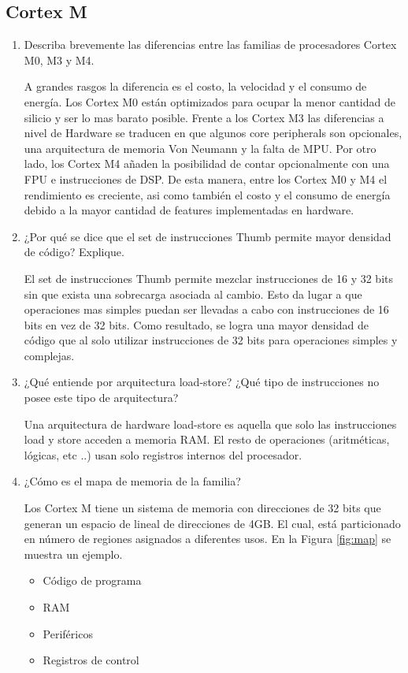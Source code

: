 \documentclass[12pt, a4paper]{article}
\begin{document}
\subsection{Cortex M}
\begin{enumerate}
    \item Describa brevemente las diferencias entre las familias de procesadores Cortex M0, M3 
    y M4.
    
    A grandes rasgos la diferencia es el costo, la velocidad y el consumo de energía. Los 
    Cortex M0 están optimizados para ocupar la menor cantidad de silicio y ser lo mas barato 
    posible. Frente a los Cortex M3 las diferencias a nivel de Hardware se traducen en
    que algunos core peripherals son opcionales, una arquitectura de memoria Von Neumann y la 
    falta de MPU. Por otro lado, los Cortex M4 añaden la posibilidad de contar opcionalmente 
    con una FPU e instrucciones de DSP. De esta manera, entre los Cortex M0 y M4 el rendimiento
    es creciente, asi como también el costo y el consumo de energía debido a la mayor cantidad 
    de features implementadas en hardware.
    
    \item ¿Por qué se dice que el set de instrucciones Thumb permite mayor densidad de código?
    Explique.
    
    El set de instrucciones Thumb permite mezclar instrucciones de 16 y 32 bits sin que exista una 
    sobrecarga asociada al cambio. Esto da lugar a que operaciones mas simples puedan ser llevadas 
    a cabo con instrucciones de 16 bits en vez de 32 bits. Como resultado, se logra 
    una mayor densidad de código que al solo utilizar instrucciones de 32 bits para operaciones 
    simples y complejas.
        
    \item ¿Qué entiende por arquitectura load-store? ¿Qué tipo de instrucciones no posee este
    tipo de arquitectura?
    
    Una arquitectura de hardware load-store es aquella que solo las instrucciones load y store 
    acceden a memoria RAM. El resto de operaciones (aritméticas, lógicas, etc ..) usan solo 
    registros internos del procesador.
    
    \item ¿Cómo es el mapa de memoria de la familia?
    
    Los Cortex M tiene un sistema de memoria con direcciones de 32 bits que
    generan un espacio de lineal de direcciones de 4GB. El cual, está particionado en 
    número de regiones asignados a diferentes usos. En la Figura \ref{fig:map} se muestra
    un ejemplo.
    \begin{itemize}
        \item Código de programa
        \item RAM
        \item Periféricos
        \item Registros de control
    \end{itemize}
    

\end{enumerate}
\end{document}
